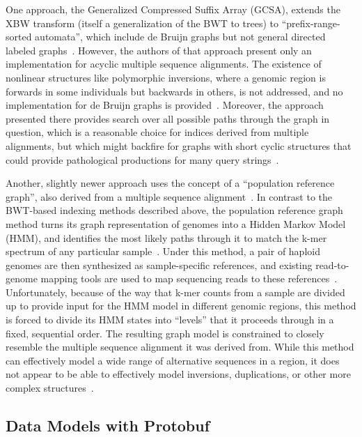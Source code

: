One approach, the Generalized Compressed Suffix Array (GCSA), extends the XBW transform (itself a generalization of the BWT to trees) to ``prefix-range-sorted automata'', which include de Bruijn graphs but not general directed labeled graphs~\cite{siren2014indexing}. However, the authors of that approach present only an implementation for acyclic multiple sequence alignments. The existence of nonlinear structures like polymorphic inversions, where a genomic region is forwards in some individuals but backwards in others, is not addressed, and no implementation for de Bruijn graphs is provided~\cite{siren2014indexing}. Moreover, the approach presented there provides search over all possible paths through the graph in question, which is a reasonable choice for indices derived from multiple alignments, but which might backfire for graphs with short cyclic structures that could provide pathological productions for many query strings~\cite{siren2014indexing}.

Another, slightly newer approach uses the concept of a ``population reference graph'', also derived from a multiple sequence alignment~\cite{dilthey2015improved}. In contrast to the BWT-based indexing methods described above, the population reference graph method turns its graph representation of genomes into a Hidden Markov Model (HMM), and identifies the most likely paths through it to match the k-mer spectrum of any particular sample~\cite{dilthey2015improved}. Under this method, a pair of haploid genomes are then synthesized as sample-specific references, and existing read-to-genome mapping tools are used to map sequencing reads to these references~\cite{dilthey2015improved}. Unfortunately, because of the way that k-mer counts from a sample are divided up to provide input for the HMM model in different genomic regions, this method is forced to divide its HMM states into ``levels'' that it proceeds through in a fixed, sequential order. The resulting graph model is constrained to closely resemble the multiple sequence alignment it was derived from. While this method can effectively model a wide range of alternative sequences in a region, it does not appear to be able to effectively model inversions, duplications, or other more complex structures~\cite{dilthey2015improved}.



\subsection{Data Models with Protobuf}

